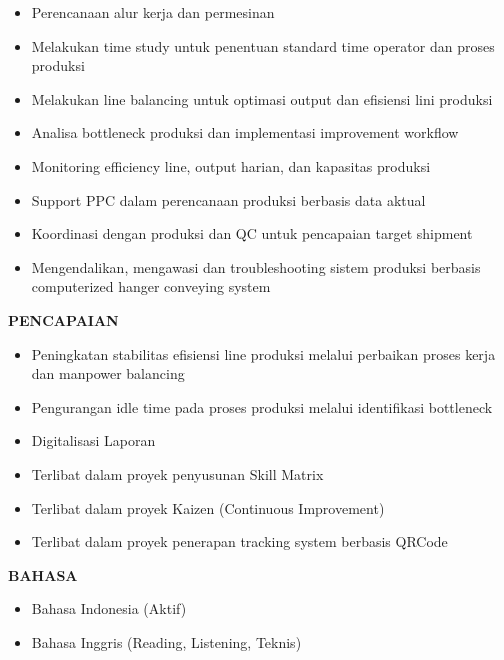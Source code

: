 \documentclass[a4paper,11pt]{article}
\begin{document}
\begin{itemize}
\item Perencanaan alur kerja dan permesinan
\item Melakukan time study untuk penentuan standard time operator dan proses produksi
\item Melakukan line balancing untuk optimasi output dan efisiensi lini produksi
\item Analisa bottleneck produksi dan implementasi improvement workflow
\item Monitoring efficiency line, output harian, dan kapasitas produksi
\item Support PPC dalam perencanaan produksi berbasis data aktual
\item Koordinasi dengan produksi dan QC untuk pencapaian target shipment
\item Mengendalikan, mengawasi dan troubleshooting sistem produksi berbasis computerized hanger conveying  system
\end{itemize}

\vspace{8pt}

\textbf{PENCAPAIAN}

\begin{itemize}
\item Peningkatan stabilitas efisiensi line produksi melalui perbaikan proses kerja dan manpower balancing
\item Pengurangan idle time pada proses produksi melalui identifikasi bottleneck
\item Digitalisasi Laporan
\item Terlibat dalam proyek penyusunan Skill Matrix
\item Terlibat dalam proyek Kaizen (Continuous Improvement)
\item Terlibat dalam proyek penerapan tracking system berbasis QRCode\\
\end{itemize}
\vspace{8pt}

\textbf{BAHASA}

\begin{itemize}
\item Bahasa Indonesia (Aktif)
\item Bahasa Inggris (Reading, Listening, Teknis)
\end{itemize}
\end{document}
